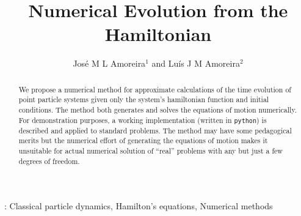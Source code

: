 \documentclass{iopart}
\begin{document}
\title{Numerical Evolution from the Hamiltonian}
\author{José M L Amoreira$^1$ and Luís J M Amoreira$^2$}
\address{$^1$ Departamento de Física, Instituto Superior Técnico, Lisboa,
Portugal}
\address{$^2$ Departamento de Física, Universidade da Beira Interior, Covilhã,
Portugal}
\begin{abstract}
  We propose a numerical method for approximate calculations of the time
  evolution of point particle systems given only the system's hamiltonian
  function and initial conditions. The method both generates and solves the
  equations of motion numerically. For demonstration purposes, a working
  im\-ple\-men\-ta\-tion (written in \texttt{python}) is described and applied
  to standard problems. The method may have some pedagogical merits but the
  numerical effort of generating the equations of motion makes it unsuitable for
  actual numerical solution of ``real'' problems with any but just a few degrees
  of freedom.
\end{abstract}
: Classical particle dynamics,
Hamilton's equations,
Numerical methods

\submitto{\EJP}
\end{document}
